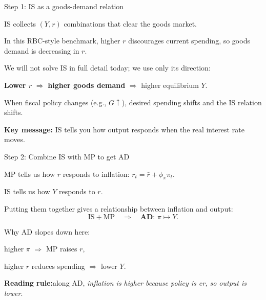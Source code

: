 \documentclass[aspectratio=169,xcolor=dvipsnames]{beamer}
\let\tempone\itemize
\let\temptwo\enditemize
\renewenvironment{itemize}{\tempone\addtolength{\itemsep}{\fill}}{\temptwo}
\begin{document}
\begin{frame}{Step 1: IS as a goods-demand relation}
\begin{itemize}
\item IS collects $(Y,r)$ combinations that clear the goods market.
\item In this RBC-style benchmark, higher $r$ discourages current spending, so goods demand is decreasing in $r$.
\item We will not solve IS in full detail today; we use only its direction:
\begin{itemize}
\item \textbf{Lower $r$} $\Rightarrow$ \textbf{higher goods demand} $\Rightarrow$ higher equilibrium $Y$.
\end{itemize}
\item When fiscal policy changes (e.g., $G\uparrow$), desired spending shifts and the IS relation shifts.
\end{itemize}

\vspace{0.3em}
\textbf{Key message:} IS tells you how output responds when the real interest rate moves.
\end{frame}

\begin{frame}{Step 2: Combine IS with MP to get AD}
\begin{itemize}
\item MP tells us how $r$ responds to inflation: $r_t=\bar r+\phi_\pi\pi_t$.
\item IS tells us how $Y$ responds to $r$.
\item Putting them together gives a relationship between inflation and output:
\[
\text{IS} + \text{MP} \quad\Rightarrow\quad \textbf{AD: } \pi \mapsto Y.
\]
\item Why AD slopes down here:
\begin{itemize}
\item higher $\pi$ $\Rightarrow$ MP raises $r$,
\item higher $r$ reduces spending $\Rightarrow$ lower $Y$.
\end{itemize}
\end{itemize}

\vspace{0.2em}
\textbf{Reading rule:}\quad along AD, \emph{inflation is higher because policy is er, so output is lower}.
\end{frame}
\end{document}
